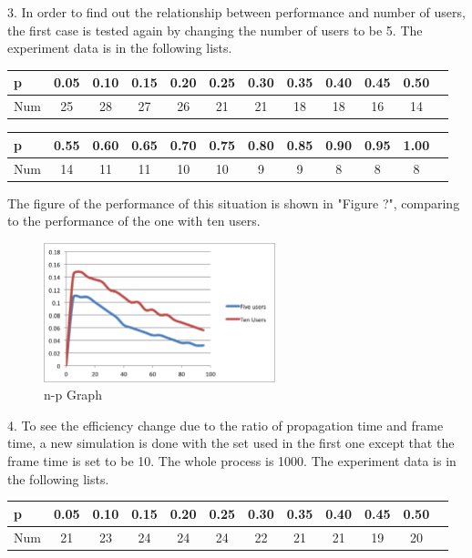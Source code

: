 \documentclass[11pt,a4paper]{report}
\begin{document}
3. In order to find out the relationship between performance and number of users, the first case is tested again by changing the number of users to be 5. The experiment data is in the following lists.
\begin{table}[htbp]
\begin{tabular}{lccccccccccc}
\toprule
p & 0.05 & 0.10 & 0.15  & 0.20 & 0.25 & 0.30 & 0.35 & 0.40 & 0.45 & 0.50 \\
\midrule
Num & 25 & 28 & 27 & 26 & 21 & 21 & 18 & 18 & 16 & 14 \\
\bottomrule
\end{tabular}
\end{table}

\begin{table}[htbp]
\begin{tabular}{lccccccccccc}
\toprule
p & 0.55 & 0.60 & 0.65  & 0.70 & 0.75 & 0.80 & 0.85 & 0.90 & 0.95 & 1.00 \\
\midrule
Num & 14 & 11 & 11 & 10 & 10 & 9 & 9 & 8 & 8 & 8 \\
\bottomrule
\end{tabular}
\end{table}

The figure of the performance of this situation is shown in "Figure ?", comparing to the performance of the one with ten users.
\begin{figure}
\centering
\includegraphics[width=0.6\textwidth]{4_4.eps}
\caption{n-p Graph}
\end{figure}

4. To see the efficiency change due to the ratio of propagation time and frame time, a new simulation is done with the set used in the first one except that the frame time is set to be 10. The whole process is 1000. The experiment data is in the following lists.
\begin{table}[htbp]
\begin{tabular}{lccccccccccc}
\toprule
p & 0.05 & 0.10 & 0.15  & 0.20 & 0.25 & 0.30 & 0.35 & 0.40 & 0.45 & 0.50 \\
\midrule
Num & 21 & 23 & 24 & 24 & 24 & 22 & 21 & 21 & 19 & 20 \\
\bottomrule
\end{tabular}
\end{table}
\end{document}
